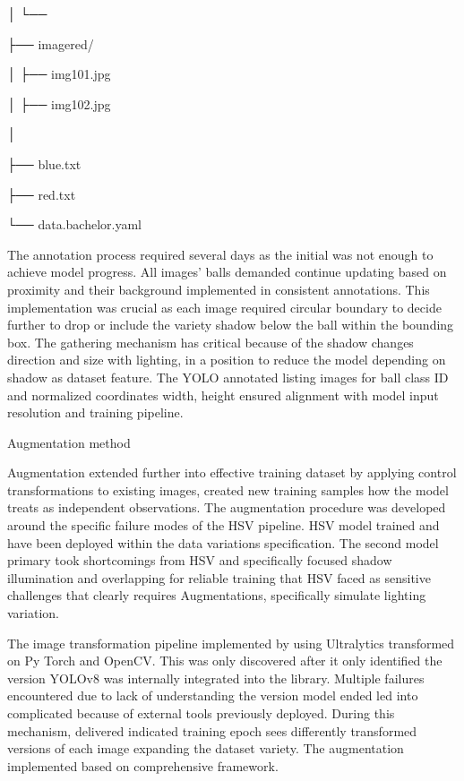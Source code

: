  │ └── 

 ├── imagered/

 │ ├── img101.jpg

 │ ├── img102.jpg

 │

 ├── blue.txt

 ├── red.txt

 └── data.bachelor.yaml

The annotation process required several days as the initial was not enough to achieve model progress. All images’ balls demanded continue updating based on proximity and their background implemented in consistent annotations. This implementation was crucial as each image required circular boundary to decide further to drop or include the variety shadow below the ball within the bounding box. The gathering mechanism has critical because of the shadow changes direction and size with lighting, in a position to reduce the model depending on shadow as dataset feature. The YOLO annotated listing images for ball class ID and normalized coordinates width, height ensured alignment with model input resolution and training pipeline.

Augmentation method 

Augmentation extended further into effective training dataset by applying control transformations to existing images, created new training samples how the model treats as independent observations. The augmentation procedure was developed around the specific failure modes of the HSV pipeline. HSV model trained and have been deployed within the data variations specification. The second model primary took shortcomings from HSV and specifically focused shadow illumination and overlapping  for reliable training that HSV faced as sensitive challenges that clearly requires Augmentations, specifically simulate lighting variation.


The image transformation pipeline implemented by using Ultralytics transformed on Py Torch and OpenCV. This was only discovered after it only identified the version YOLOv8 was internally integrated into the library. Multiple failures encountered due to lack of understanding the version model ended led into complicated because of external tools previously deployed. During this mechanism, delivered indicated training epoch sees differently transformed versions of each image expanding the dataset variety. The augmentation implemented based on comprehensive framework.



